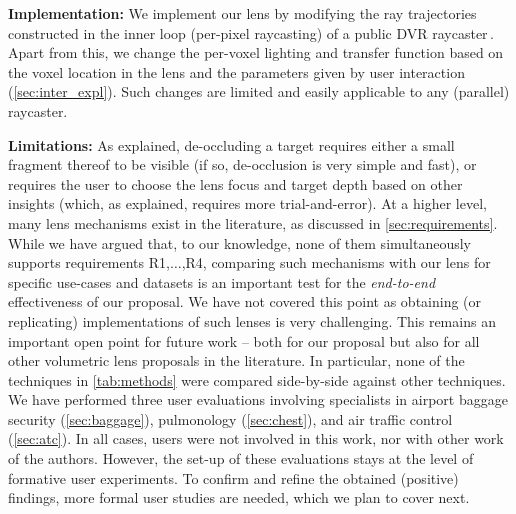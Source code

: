 \par \textbf{Implementation:} We implement our lens by modifying the ray trajectories constructed in the inner loop (per-pixel raycasting) of a public DVR raycaster\,\cite{cudasdk}. Apart from this, we change the per-voxel lighting and transfer function based on the voxel location in the lens and the parameters given by user interaction (\autoref{sec:inter_expl}). Such changes are limited and easily applicable to any (parallel) raycaster.


\par \textbf{Limitations:} As explained, de-occluding a target requires either a small fragment thereof to be visible (if so, de-occlusion is very simple and fast), or requires the user to choose the lens focus and target depth based on other insights (which, as explained, requires more trial-and-error). At a higher level, many lens mechanisms exist in the literature, as discussed in \autoref{sec:requirements}. While we have argued that, to our knowledge, none of them simultaneously supports requirements R1,$\ldots$,R4, comparing such mechanisms with our lens for specific use-cases and datasets is an important test for the \emph{end-to-end} effectiveness of our proposal. We have not covered this point as obtaining (or replicating)  implementations of such lenses is very challenging. This remains an important open point for future work -- both for our proposal but also for all other volumetric lens proposals in the literature. In particular, none of the techniques in \autoref{tab:methods} were compared side-by-side against other techniques. We have performed three user evaluations involving specialists in airport baggage security (\autoref{sec:baggage}), pulmonology (\autoref{sec:chest}), and air traffic control (\autoref{sec:atc}). In all cases, users were not involved in this work, nor with other work of the authors. However, the set-up of these evaluations stays at the level of formative user experiments. To confirm and refine the obtained (positive) findings, more formal user studies are needed, which we plan to cover next.


